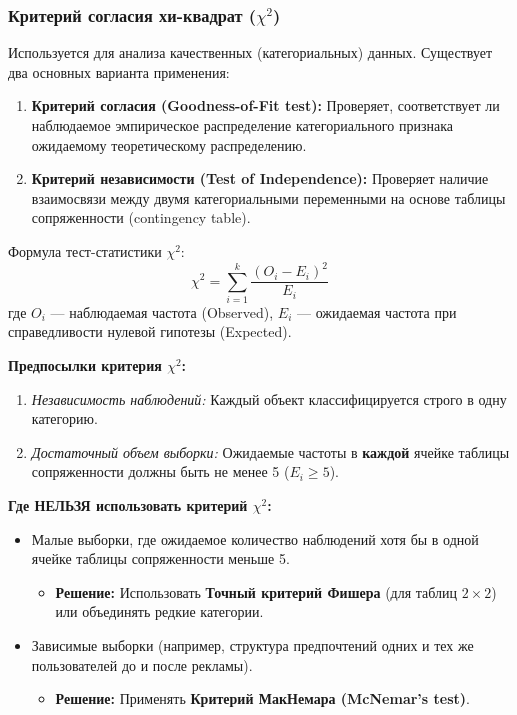 \documentclass[12pt]{article}
\begin{document}
\subsubsection{Критерий согласия хи-квадрат ($\chi^2$)}
Используется для анализа качественных (категориальных) данных. Существует два основных варианта применения:
\begin{enumerate}
    \item \textbf{Критерий согласия (Goodness-of-Fit test):} Проверяет, соответствует ли наблюдаемое эмпирическое распределение категориального признака ожидаемому теоретическому распределению.
    \item \textbf{Критерий независимости (Test of Independence):} Проверяет наличие взаимосвязи между двумя категориальными переменными на основе таблицы сопряженности (contingency table).
\end{enumerate}

Формула тест-статистики $\chi^2$:
\begin{equation}
    \chi^2 = \sum_{i=1}^k \frac{(O_i - E_i)^2}{E_i}
\end{equation}
где $O_i$ --- наблюдаемая частота (Observed), $E_i$ --- ожидаемая частота при справедливости нулевой гипотезы (Expected).

\textbf{Предпосылки критерия $\chi^2$:}
\begin{enumerate}
    \item \textit{Независимость наблюдений:} Каждый объект классифицируется строго в одну категорию.
    \item \textit{Достаточный объем выборки:} Ожидаемые частоты в \textbf{каждой} ячейке таблицы сопряженности должны быть не менее 5 ($E_i \ge 5$).
\end{enumerate}

\textbf{Где НЕЛЬЗЯ использовать критерий $\chi^2$:}
\begin{itemize}
    \item Малые выборки, где ожидаемое количество наблюдений хотя бы в одной ячейке таблицы сопряженности меньше 5.
    \begin{itemize}
        \item \textbf{Решение:} Использовать \textbf{Точный критерий Фишера} (для таблиц $2 \times 2$) или объединять редкие категории.
    \end{itemize}
    \item Зависимые выборки (например, структура предпочтений одних и тех же пользователей до и после рекламы).
    \begin{itemize}
        \item \textbf{Решение:} Применять \textbf{Критерий МакНемара (McNemar's test)}.
    \end{itemize}
\end{itemize}
\end{document}
